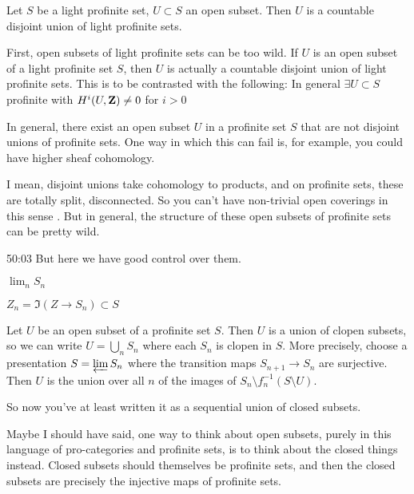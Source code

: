 \begin{example}
\begin{proposition}
Let $S$ be a light profinite set, $U \subset S$ an open subset.
Then $U$ is a countable disjoint union of light profinite sets.
\end{proposition}
First, open subsets of light profinite sets can be too wild. If $U$ is an open subset of a light profinite set $S$, then $U$ is actually a countable disjoint union of light profinite sets. This is to be contrasted with the following: 
In general $\exists U \subset S$ profinite with $H^i (U, \mathbf Z) \neq 0$ for $i >0$

In general, there exist an open subset $U$ in a profinite set $S$ that are not disjoint unions of profinite sets. One way in which this can fail is, for example, you could have higher sheaf cohomology. 

I mean, disjoint unions take cohomology to products, and on profinite sets, these are totally split, disconnected. So you can't have non-trivial open coverings in this sense . But in general, the structure of these open subsets of profinite sets can be pretty wild.

\begin{unfinished}{50:03}
But here we have good control over them. 

\begin{sketch}

$\lim_n S_n $

$Z_n = \Im(Z \to S_n ) \subset S $

Let $U$ be an open subset of a profinite set $S$. Then $U$ is a union of clopen subsets, so we can write $U = \bigcup_{n} S_n$ where each $S_n$ is clopen in $S$. More precisely, choose a presentation $S = \varprojlim S_n$ where the transition maps $S_{n+1} \to S_n$ are surjective. Then $U$ is the union over all $n$ of the images of $S_n \setminus f_n^{-1}(S \setminus U)$.

So now you've at least written it as a sequential union of closed subsets. 

\end{sketch}

Maybe I should have said, one way to think about open subsets, purely in this language of pro-categories and profinite sets, is to think about the closed things instead. Closed subsets should themselves be profinite sets, and then the closed subsets are precisely the injective maps of profinite sets.


\end{unfinished}
\end{example}

